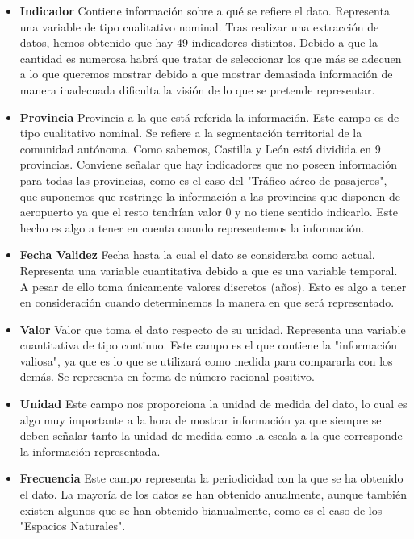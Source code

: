 \documentclass[11pt,spanish]{article}
\begin{document}
			\begin{itemize}

				\item {\bf Indicador } Contiene información sobre a qué se refiere el dato. Representa una variable de tipo cualitativo nominal. Tras realizar una extracción de datos, hemos obtenido que hay 49 indicadores distintos. Debido a que la cantidad es numerosa habrá que tratar de seleccionar los que más se adecuen a lo que queremos mostrar debido a que mostrar demasiada información de manera inadecuada dificulta la visión de lo que se pretende representar.

				\item {\bf Provincia } Provincia a la que está referida la información. Este campo es de tipo cualitativo nominal. Se refiere a la segmentación territorial de la comunidad autónoma. Como sabemos, Castilla y León está dividida en 9 provincias. Conviene señalar que hay indicadores que no poseen información para todas las provincias, como es el caso del "Tráfico aéreo de pasajeros", que suponemos que restringe la información a las provincias que disponen de aeropuerto ya que el resto tendrían valor 0 y no tiene sentido indicarlo. Este hecho es algo a tener en cuenta cuando representemos la información.

				\item {\bf Fecha Validez } Fecha hasta la cual el dato se consideraba como actual. Representa una variable cuantitativa debido a que es una variable temporal. A pesar de ello toma únicamente valores discretos (años). Esto es algo a tener en consideración cuando determinemos la manera en que será representado.

				\item {\bf Valor } Valor que toma el dato respecto de su unidad.  Representa una variable cuantitativa de tipo continuo. Este campo es el que contiene la "información valiosa", ya que es lo que se utilizará como medida para compararla con los demás. Se representa en forma de número racional positivo.

				\item {\bf Unidad } Este campo nos proporciona la unidad de medida del dato, lo cual es algo muy importante a la hora de mostrar información ya que siempre se deben señalar tanto la unidad de medida como la escala a la que corresponde la información representada.

				\item {\bf Frecuencia } Este campo representa la periodicidad con la que se ha obtenido el dato. La mayoría de los datos se han obtenido anualmente, aunque también existen algunos que se han obtenido bianualmente, como es el caso de los "Espacios Naturales".

			\end{itemize}
\end{document}
